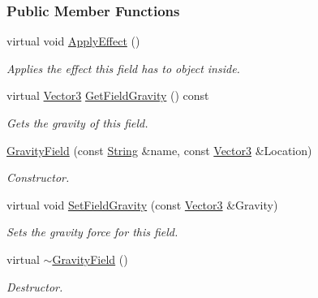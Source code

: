 \subsubsection*{Public Member Functions}
\begin{DoxyCompactItemize}
\item 
virtual void \hyperlink{classMezzanine_1_1GravityField_a53aee6679088fb6151e5cb6e82a09fb7}{ApplyEffect} ()
\begin{DoxyCompactList}\small\item\em Applies the effect this field has to object inside. \item\end{DoxyCompactList}\item 
virtual \hyperlink{classMezzanine_1_1Vector3}{Vector3} \hyperlink{classMezzanine_1_1GravityField_ad37d2c94bdabf0412e35ed59ad74e8c9}{GetFieldGravity} () const 
\begin{DoxyCompactList}\small\item\em Gets the gravity of this field. \item\end{DoxyCompactList}\item 
\hyperlink{classMezzanine_1_1GravityField_aff8a73a59ad999b49f39c4bfb564fed3}{GravityField} (const \hyperlink{namespaceMezzanine_acf9fcc130e6ebf08e3d8491aebcf1c86}{String} \&name, const \hyperlink{classMezzanine_1_1Vector3}{Vector3} \&Location)
\begin{DoxyCompactList}\small\item\em Constructor. \item\end{DoxyCompactList}\item 
virtual void \hyperlink{classMezzanine_1_1GravityField_a426b69dcfd3476029ebadea1ee4e0ea3}{SetFieldGravity} (const \hyperlink{classMezzanine_1_1Vector3}{Vector3} \&Gravity)
\begin{DoxyCompactList}\small\item\em Sets the gravity force for this field. \item\end{DoxyCompactList}\item 
virtual \hyperlink{classMezzanine_1_1GravityField_a53fe69bb37458dce9fca8df1215d739e}{$\sim$GravityField} ()
\begin{DoxyCompactList}\small\item\em Destructor. \item\end{DoxyCompactList}\end{DoxyCompactItemize}
